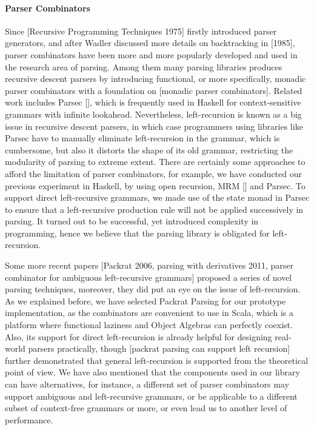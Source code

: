 \paragraph*{Parser Combinators} Since [Recursive Programming Techniques 1975] firstly introduced parser generators, and after Wadler discussed more details on backtracking in [1985], parser combinators have been more and more popularly developed and used in the research area of parsing. Among them many parsing libraries produces recursive descent parsers by introducing functional, or more specifically, monadic parser combinators with a foundation on [monadic parser combinators]. Related work includes Parsec [], which is frequently used in Haskell for context-sensitive grammars with infinite lookahead. Nevertheless, left-recursion is known as a big issue in recursive descent parsers, in which case programmers using libraries like Parsec have to manually eliminate left-recursion in the grammar, which is cumbersome, but also it distorts the shape of its old grammar, restricting the modularity of parsing to extreme extent.
There are certainly some approaches to afford the limitation of parser combinators, for example, we have conducted our previous experiment in Haskell, by using open recursion, MRM [] and Parsec. To support direct left-recursive grammars, we made use of the state monad in Parsec to ensure that a left-recursive production rule will not be applied successively in parsing. It turned out to be successful, yet introduced complexity in programming, hence we believe that the parsing library is obligated for left-recursion.

Some more recent papers [Packrat 2006, parsing with derivatives 2011, parser combinator for ambiguous left-recursive grammars]  proposed a series of novel parsing techniques, moreover, they did put an eye on the issue of left-recursion. As we explained before, we have selected Packrat Parsing for our prototype implementation, as the combinators are convenient to use in Scala, which is a platform where functional laziness and Object Algebras can perfectly coexist. Also, its support for direct left-recursion is already helpful for designing real-world parsers practically, though [packrat parsing can support left recursion] further demonstrated that general left-recursion is supported from the theoretical point of view. We have also mentioned that the components used in our library can have alternatives, for instance, a different set of parser combinators may support ambiguous and left-recursive grammars, or be applicable to a different subset of context-free grammars or more, or even lead us to another level of performance.

